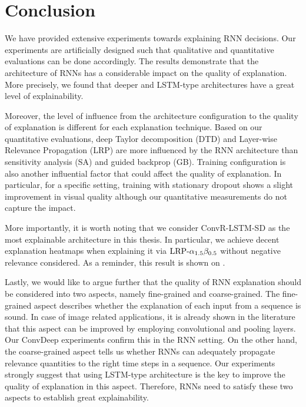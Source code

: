 \chapter{Conclusion}
\label{cha:chapter5}
We have provided extensive experiments towards explaining RNN decisions. Our experiments are artificially designed such that qualitative and quantitative evaluations can be done accordingly.  The results demonstrate that the architecture of RNNs has a considerable impact on the quality of explanation. More precisely, we found that deeper and LSTM-type architectures have a great level of explainability.

Moreover, the level of influence from the architecture configuration to the quality of explanation is different for each explanation technique. Based on our quantitative evaluations, deep Taylor decomposition (DTD) and Layer-wise Relevance Propagation (LRP) are more influenced by the RNN architecture than sensitivity analysis (SA) and guided backprop (GB).  Training configuration is also another influential factor that could affect the quality of explanation. In particular, for a specific setting, training with stationary dropout shows a slight improvement in visual quality although our quantitative measurements do not capture the impact.

More importantly, it is worth noting that we consider ConvR-LSTM-SD as the most explainable architecture in this thesis. In particular, we achieve decent explanation heatmaps when explaining it via $\text{LRP-}\alpha_{1.5}\beta_{0.5}$ without negative relevance considered. As a reminder, this result is shown on \addfigure{\ref{fig:heatmap_msc_convrlstm_pos_rel}}.

Lastly, we would like to argue further that the quality of RNN explanation should be considered into two aspects, namely fine-grained and coarse-grained.  The fine-grained aspect describes whether the explanation of each input from a sequence is sound. In case of image related applications, it is already shown in the literature that this aspect can be improved by employing convolutional and pooling layers. Our ConvDeep experiments confirm this in the RNN setting. On the other hand, the coarse-grained aspect tells us whether RNNs can adequately propagate relevance quantities to the right time steps in a sequence. Our experiments strongly suggest that using LSTM-type architecture is the key to improve the quality of explanation in this aspect. Therefore, RNNs need to satisfy these two aspects to establish great explainability.



